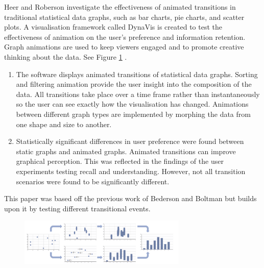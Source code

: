 \documentclass{egpubl}
\begin{document}
Heer and Roberson investigate the effectiveness of animated transitions in traditional statistical data graphs, such as bar charts, pie charts, and scatter plots. A visualisation framework called DynaVis is created to test the effectiveness of animation on the user's preference and information retention. Graph animations are used to keep viewers engaged and to promote creative thinking about the data. See Figure \ref{fig:Heer2007} \cite{heer2007}.
\begin{enumerate}
\item The software displays animated transitions of statistical data graphs. Sorting and filtering animation provide the user insight into the composition of the data. All transitions take place over a time frame rather than instantaneously so the user can see exactly how the visualisation has changed. Animations between different graph types are implemented by morphing the data from one shape and size to another.
\item Statistically significant differences in user preference were found between static graphs and animated graphs. Animated transitions can improve graphical perception. This was reflected in the findings of the user experiments testing recall and understanding. However, not all transition scenarios were found to be significantly different.
\end{enumerate}
This paper was based off the previous work of Bederson and Boltman \cite{bedrson} but builds upon it by testing different transitional events.

\begin{figure}
\begingroup
\centering
\includegraphics[width=8cm]{./images/AnimatedTransitions}
\label{fig:Heer2007}
\endgroup
\end{figure}
\end{document}
